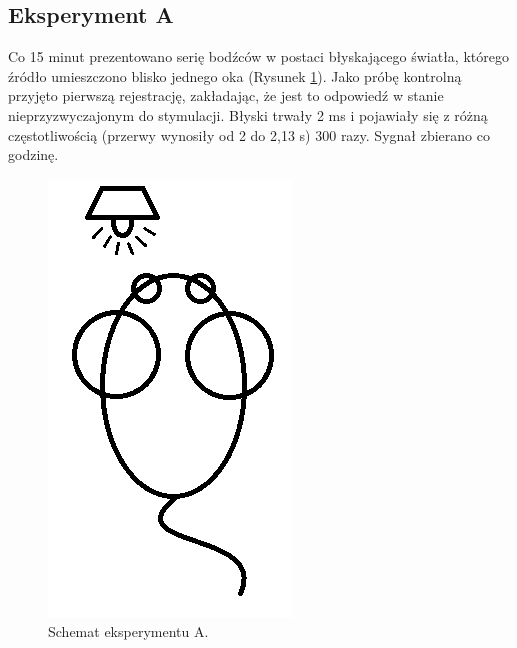 \documentclass{pracamgr_2}
\begin{document}
\subsection{Eksperyment A}
Co 15 minut prezentowano serię bodźców w postaci błyskającego światła, którego źródło umieszczono blisko jednego oka (Rysunek \ref{rys:szczur}). Jako próbę kontrolną przyjęto pierwszą rejestrację, zakładając, że jest to odpowiedź w stanie nieprzyzwyczajonym do stymulacji. Błyski trwały 2 ms i pojawiały się z różną częstotliwością (przerwy wynosiły od 2 do 2,13 s) 300 razy. Sygnał zbierano co godzinę.
\begin{figure}[htbp]
	\begin{center}
		\includegraphics[scale=0.5]{szczur.png}
	\end{center}
	\caption{Schemat eksperymentu A.}
	\label{rys:szczur}
\end{figure}
\end{document}

